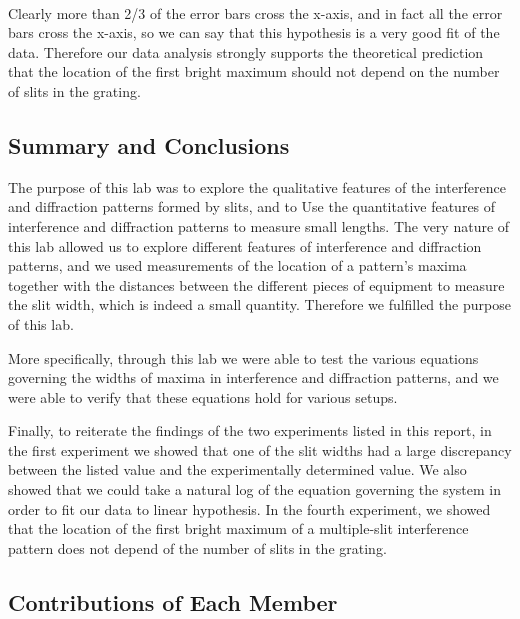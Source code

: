 \documentclass[11pt]{article}
\begin{document}
    \begin{center}
    \end{center}
    { \hspace*{\fill} \\}
    
    Clearly more than 2/3 of the error bars cross the x-axis, and in fact
all the error bars cross the x-axis, so we can say that this hypothesis
is a very good fit of the data. Therefore our data analysis strongly
supports the theoretical prediction that the location of the first
bright maximum should not depend on the number of slits in the grating.

    \hypertarget{summary-and-conclusions}{%
\subsection{Summary and Conclusions}\label{summary-and-conclusions}}

The purpose of this lab was to explore the qualitative features of the
interference and diffraction patterns formed by slits, and to Use the
quantitative features of interference and diffraction patterns to
measure small lengths. The very nature of this lab allowed us to explore
different features of interference and diffraction patterns, and we used
measurements of the location of a pattern's maxima together with the
distances between the different pieces of equipment to measure the slit
width, which is indeed a small quantity. Therefore we fulfilled the
purpose of this lab.

More specifically, through this lab we were able to test the various
equations governing the widths of maxima in interference and diffraction
patterns, and we were able to verify that these equations hold for
various setups.

Finally, to reiterate the findings of the two experiments listed in this
report, in the first experiment we showed that one of the slit widths
had a large discrepancy between the listed value and the experimentally
determined value. We also showed that we could take a natural log of the
equation governing the system in order to fit our data to linear
hypothesis. In the fourth experiment, we showed that the location of the
first bright maximum of a multiple-slit interference pattern does not
depend of the number of slits in the grating.

\hypertarget{contributions-of-each-member}{%
\subsection{Contributions of Each
Member}\label{contributions-of-each-member}}
\end{document}
